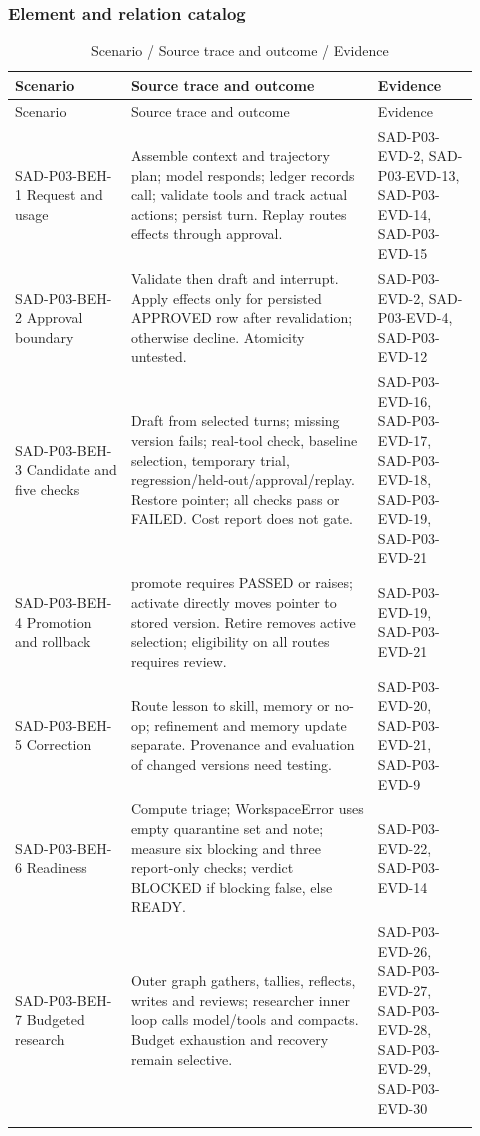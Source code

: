 \documentclass[10pt,letterpaper]{article}
\begin{document}
\subsubsection{Element and relation catalog}
\begin{longtable}{@{}>{\raggedright\arraybackslash}p{0.23\linewidth}>{\raggedright\arraybackslash}p{0.49\linewidth}>{\raggedright\arraybackslash}p{0.2\linewidth}@{}}
\caption{Scenario / Source trace and outcome / Evidence}\\
\toprule Scenario & Source trace and outcome & Evidence\\\midrule\endfirsthead
\toprule Scenario & Source trace and outcome & Evidence\\\midrule\endhead
SAD-P03-BEH-1 Request and usage & Assemble context and trajectory plan; model responds; ledger records call; validate tools and track actual actions; persist turn. Replay routes effects through approval. & SAD-P03-EVD-2, SAD-P03-EVD-13, SAD-P03-EVD-14, SAD-P03-EVD-15\\\addlinespace
SAD-P03-BEH-2 Approval boundary & Validate then draft and interrupt. Apply effects only for persisted APPROVED row after revalidation; otherwise decline. Atomicity untested. & SAD-P03-EVD-2, SAD-P03-EVD-4, SAD-P03-EVD-12\\\addlinespace
SAD-P03-BEH-3 Candidate and five checks & Draft from selected turns; missing version fails; real-tool check, baseline selection, temporary trial, regression/held-out/approval/replay. Restore pointer; all checks pass or FAILED. Cost report does not gate. & SAD-P03-EVD-16, SAD-P03-EVD-17, SAD-P03-EVD-18, SAD-P03-EVD-19, SAD-P03-EVD-21\\\addlinespace
SAD-P03-BEH-4 Promotion and rollback & promote requires PASSED or raises; activate directly moves pointer to stored version. Retire removes active selection; eligibility on all routes requires review. & SAD-P03-EVD-19, SAD-P03-EVD-21\\\addlinespace
SAD-P03-BEH-5 Correction & Route lesson to skill, memory or no-op; refinement and memory update separate. Provenance and evaluation of changed versions need testing. & SAD-P03-EVD-20, SAD-P03-EVD-21, SAD-P03-EVD-9\\\addlinespace
SAD-P03-BEH-6 Readiness & Compute triage; WorkspaceError uses empty quarantine set and note; measure six blocking and three report-only checks; verdict BLOCKED if blocking false, else READY. & SAD-P03-EVD-22, SAD-P03-EVD-14\\\addlinespace
SAD-P03-BEH-7 Budgeted research & Outer graph gathers, tallies, reflects, writes and reviews; researcher inner loop calls model/tools and compacts. Budget exhaustion and recovery remain selective. & SAD-P03-EVD-26, SAD-P03-EVD-27, SAD-P03-EVD-28, SAD-P03-EVD-29, SAD-P03-EVD-30\\\addlinespace
\bottomrule\end{longtable}
\end{document}
